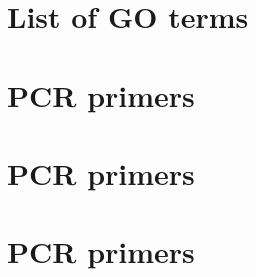 \documentclass[11pt,twoside,a4paper]{report}
\begin{document}
\cleardoublepage
\begin{appendices}
  \chapter{List of GO terms}
  \chapter{PCR primers}
  \chapter{PCR primers}
  \chapter{PCR primers}
\end{appendices}
\end{document}
